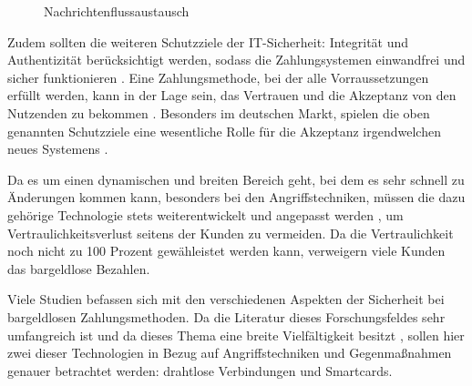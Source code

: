 \vfill
\begin{figure}[H]
    \caption{Nachrichtenflussaustausch \cite{refart:JTAS}}
    \label{fig:refart:JTAS_2}
\end{figure}
\vfill


Zudem sollten die weiteren Schutzziele der IT-Sicherheit: Integrität und Authentizität berücksichtigt werden, 
sodass die Zahlungsystemen einwandfrei und sicher funktionieren \cite{refip:GMPS}. Eine Zahlungsmethode, bei der 
alle Vorraussetzungen erfüllt werden, kann in der Lage sein, das Vertrauen und die Akzeptanz von den Nutzenden 
zu bekommen \cite{refart:HARE}. Besonders im deutschen Markt, spielen die oben genannten Schutzziele eine 
wesentliche Rolle für die Akzeptanz irgendwelchen neues Systemens \cite{refip:DKAM}.


Da es um einen dynamischen und breiten Bereich geht, bei dem es sehr schnell zu Änderungen kommen kann, 
besonders bei den Angriffstechniken, müssen die dazu gehörige Technologie stets weiterentwickelt und 
angepasst werden \cite{refip:NYRS}, um Vertraulichkeitsverlust seitens der Kunden zu vermeiden. 
Da die Vertraulichkeit noch nicht zu 100 Prozent gewähleistet werden kann, verweigern viele Kunden
das bargeldlose Bezahlen.


Viele Studien befassen sich mit den verschiedenen Aspekten der Sicherheit bei bargeldlosen Zahlungsmethoden.
Da die Literatur dieses Forschungsfeldes sehr umfangreich ist und da dieses Thema eine breite Vielfältigkeit 
besitzt \cite{refip:GMPS}, sollen hier zwei dieser Technologien in Bezug auf Angriffstechniken und
Gegenmaßnahmen genauer betrachtet werden: drahtlose Verbindungen und Smartcards.

